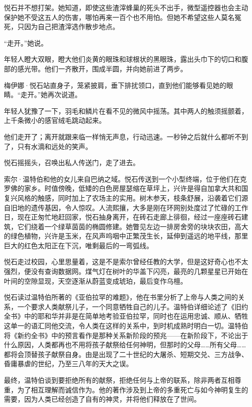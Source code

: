 \documentclass[AutoFakeBold=true]{book}
\begin{document}
悦石并不想打架。她知道，即使这些渣滓蜂巢的死头不出手，微型遥控器也会主动保护她不受这五人的伤害，哪怕再来一百个也不用怕。但她不希望这些人莫名冤死，只因为自己把渣滓选作散步地点。

``走开。''她说。

年轻人瞪大双眼，瞪大他们炎黄的眼珠和球根状的黑眼珠，露出头巾下的切口和腹部的感光带。他们一齐散开，围成半圆，并向她前进了两步。

梅伊娜·悦石站直身子，笼紧披肩，垂下排扰领口，直到他们能够看见她的眼睛。``走开。''她再次说道。

年轻人犹豫了一下，羽毛和鳞片在看不见的微风中摇荡。其中两人的触须摇颤着，上千条微小的感官绒毛跳动起来。

他们走开了；离开就跟来临一样悄无声息，行动迅速。一秒钟之后就什么都听不到了，只有水滴和远处的笑声。

悦石摇摇头，召唤出私人传送门，走了进去。

\vspace*{1em}

索尔·温特伯和他的女儿来自巴纳之域。悦石传送到一个小型终端，位于他们在克罗佛的家乡。时值傍晚，低矮的白色房屋瑟缩在草坪上，兴许是得自加拿大共和国复兴风格的触感，同时加上了农场主的实用。树木参天，枝条舒展，沿袭着它们源自旧地的遗传基因，令人惊叹。人流熙攘，大多是刚在环网别处度过了忙碌的工作日，现在正匆忙地赶回家，悦石抽身离开，在砖石走廊上徘徊，经过一座座砖石建筑，它们绕着一个绿草茵茵的椭圆修建。她瞥见左边一排房舍旁的块块农田，高大的绿色植物，兴许是玉米，在风声呜咽中正繁茂生长，延伸到遥远的地平线，那里巨大的红色太阳正在下沉，唯剩最后的一弯弧线。

悦石走过校园，心里思量着，这是不是索尔曾经任教的大学，但是这好奇心也不太强烈，便没有查询数据网。煤气灯在树叶的华盖下闪亮，最亮的几颗星星已开始在叶间的空隙显现，天空逐渐从蔚蓝变成琥珀，最后变作乌檀。

悦石读过温特伯所著的《亚伯拉罕的难题》，他在书里分析了上帝与人类之间的关系，一个要求人类献祭儿子，一个同意牺牲自己的儿子。温特伯详细论述了《旧约全书》中的耶和华并非是在简单地考验亚伯拉罕，同时也在运用忠诚、顺从、牺牲这单一的语汇同他交流，令人类在这样的关系中，到时机成熟时明白一切。温特伯将《新约全书》中的预言看作是那种关系新阶段的预兆——在新阶段下，不论出于什么原因，人类都再也不用将孩子献祭给任何神明，但那时的父母……所有父母……都将会顶替孩子献祭自身。由是出现了二十世纪的大屠杀、短期交兑、三方战争、昏庸暴虐的世纪，乃至三八年的天大之误。

最终，温特伯谈到要拒绝所有的献祭，拒绝任何与上帝的联系，除非两者互相尊重，为了相互理解而诚信作为。他的著作涉及到上帝的多重死亡与如今神明复生的需要，因为人类已经创造了自有的神灵，并将他们释放在了世间。
\end{document}
